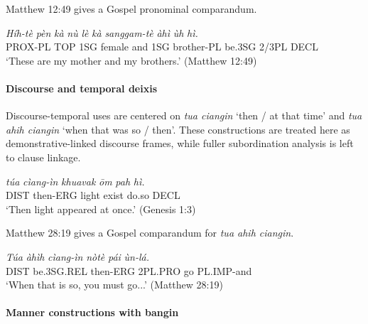 \documentclass[
  11pt,
  a4paper,
]{article}
\newcommand{\tdim}[1]{\textit{#1}}
\newcommand{\tdimword}[1]{\textit{#1}}
\renewcommand{\textsc}[1]{{\footnotesize\MakeUppercase{#1}}}
\newcommand{\glossquote}[1]{`#1'}
\begin{document}
Matthew 12:49 gives a Gospel pronominal comparandum.

\begin{exe}
\ex \label{ex:dem-pronominal-hihte}
\gll \tdimword{Híh-tè} \tdimword{pèn} \tdimword{kà} \tdimword{nù} \tdimword{lè} \tdimword{kà} \tdimword{sanggam-tè} \tdimword{àhì} \tdimword{ùh} \tdimword{hì.} \\
     \textsc{prox}-\textsc{pl} \textsc{top} \textsc{1sg} female and \textsc{1sg} brother-\textsc{pl} be.\textsc{3sg} 2/3PL \textsc{decl} \\
\glt \glossquote{These are my mother and my brothers.} (Matthew 12:49)
\end{exe}

\paragraph{Discourse and temporal
deixis}\label{discourse-and-temporal-deixis}

Discourse-temporal uses are centered on \tdim{tua ciangin}
\glossquote{then / at that time} and \tdim{tua ahih ciangin}
\glossquote{when that was so / then}. These constructions are treated
here as demonstrative-linked discourse frames, while fuller
subordination analysis is left to clause linkage.

\begin{exe}
\ex \label{ex:dem-tua-ciangin}
\gll \tdimword{túa} \tdimword{cìang-ìn} \tdimword{khuavak} \tdimword{ōm} \tdimword{pah} \tdimword{hì.} \\
     \textsc{dist} then-\textsc{erg} light exist do.so \textsc{decl} \\
\glt \glossquote{Then light appeared at once.} (Genesis 1:3)
\end{exe}

Matthew 28:19 gives a Gospel comparandum for \tdim{tua ahih ciangin}.

\begin{exe}
\ex \label{ex:dem-tua-ahih-ciangin}
\gll \tdimword{Túa} \tdimword{àhìh} \tdimword{cìang-ìn} \tdimword{nòtè} \tdimword{pái} \tdimword{ùn-lá.} \\
     \textsc{dist} be.\textsc{3sg}.\textsc{rel} then-\textsc{erg} \textsc{2pl}.\textsc{pro} go \textsc{pl}.\textsc{imp}-and \\
\glt \glossquote{When that is so, you must go...} (Matthew 28:19)
\end{exe}

\paragraph{Manner constructions with
bangin}\label{manner-constructions-with-bangin}
\end{document}
